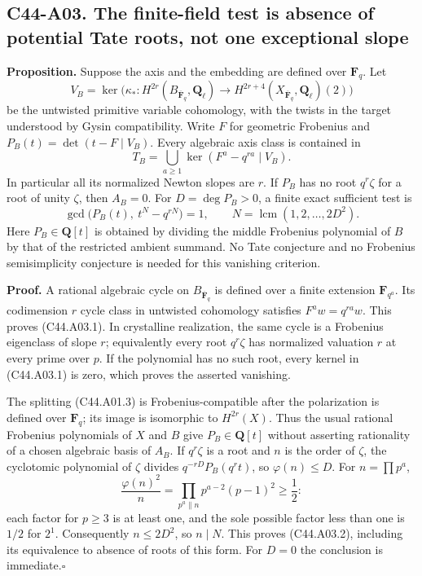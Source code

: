 \documentclass[11pt]{article}
\theoremstyle{remark}\newtheorem{remark}[theorem]{Remark}
\begin{document}
\subsection*{C44-A03. The finite-field test is absence of potential Tate roots, not one exceptional slope}

\textbf{Proposition.}
Suppose the axis and the embedding are defined over $\mathbf F_q$.
Let
\[
 V_B=\ker\bigl(\kappa_*:H^{2r}(B_{\overline{\mathbf F}_q},
 \mathbf Q_\ell)\longrightarrow H^{2r+4}(X_{\overline{\mathbf F}_q},
 \mathbf Q_\ell)(2)\bigr)
\]
be the untwisted primitive variable cohomology, with the twists in
the target understood by Gysin compatibility. Write $F$ for
geometric Frobenius and $P_B(t)=\det(t-F\mid V_B)$.
Every algebraic axis class is contained in
\[
 T_B=\bigcup_{a\ge1}\ker(F^a-q^{ra}\mid V_B).                \tag{C44.A03.1}
\]
In particular all its normalized Newton slopes are $r$.
If $P_B$ has no root $q^r\zeta$ for a root of unity $\zeta$,
then $A_B=0$.
For $D=\deg P_B>0$, a finite exact sufficient test is
\[
 \gcd\bigl(P_B(t),\ t^N-q^{rN}\bigr)=1,
 \qquad N=\operatorname{lcm}(1,2,\ldots,2D^2).               \tag{C44.A03.2}
\]
Here $P_B\in\mathbf Q[t]$ is obtained by dividing the middle
Frobenius polynomial of $B$ by that of the restricted ambient
summand. No Tate conjecture and no Frobenius semisimplicity
conjecture is needed for this vanishing criterion.

\textbf{Proof.}
A rational algebraic cycle on $B_{\overline{\mathbf F}_q}$ is
defined over a finite extension $\mathbf F_{q^a}$. Its codimension
$r$ cycle class in untwisted cohomology satisfies $F^a w=q^{ra}w$.
This proves (C44.A03.1). In crystalline realization, the same
cycle is a Frobenius eigenclass of slope $r$; equivalently every
root $q^r\zeta$ has normalized valuation $r$ at every prime over
$p$.
If the polynomial has no such root, every kernel in (C44.A03.1)
is zero, which proves the asserted vanishing.

The splitting (C44.A01.3) is Frobenius-compatible after the
polarization is defined over $\mathbf F_q$; its image is isomorphic
to $H^{2r}(X)$. Thus the usual rational Frobenius polynomials of
$X$ and $B$ give $P_B\in\mathbf Q[t]$ without asserting
rationality of a chosen algebraic basis of $A_B$.
If $q^r\zeta$ is a root and $n$ is the order of $\zeta$, the
cyclotomic polynomial of $\zeta$ divides
$q^{-rD}P_B(q^rt)$, so $\varphi(n)\le D$.
For $n=\prod p^a$,
\[
 \frac{\varphi(n)^2}{n}=\prod_{p^a\parallel n}p^{a-2}(p-1)^2
 \ge\frac12:
\]
each factor for $p\ge3$ is at least one, and the sole possible
factor less than one is $1/2$ for $2^1$. Consequently $n\le2D^2$,
so $n\mid N$. This proves (C44.A03.2), including its equivalence
to absence of roots of this form. For $D=0$ the conclusion is
immediate.\hfill$\square$
\end{document}
